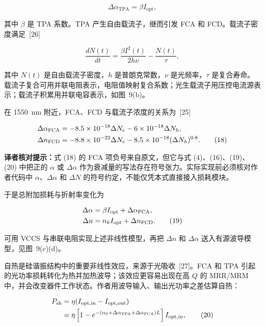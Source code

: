 \documentclass[11pt,a4paper]{ctexart}
\newcommand{\transnote}[1]{%
  \par\noindent\colorbox{yellow!16}{%
    \parbox{\dimexpr\linewidth-2\fboxsep}{\textbf{译者核对提示：}#1}}\par}
\begin{document}
\begin{equation}
\Delta\alpha_{\mathrm{TPA}}=\beta I_{\mathrm{opt}},
\tag{16}
\end{equation}

其中 $\beta$ 是 TPA 系数。TPA 产生自由载流子，继而引发 FCA 和 FCD。载流子密度满足~[26]

\begin{equation}
\frac{dN(t)}{dt}=\frac{\beta I^2(t)}{2h\nu}-\frac{N(t)}{\tau},
\tag{17}
\end{equation}

其中 $N(t)$ 是自由载流子密度，$h$ 是普朗克常数，$\nu$ 是光频率，$\tau$ 是复合寿命。载流子复合可用并联电阻表示，电阻值映射复合系数；光生载流子用压控电流源表示；载流子积累用并联电容表示，如图~9(b)。

在 1550~nm 附近，FCA、FCD 与载流子浓度的关系为~[25]

\begin{align}
\Delta\alpha_{\mathrm{FCA}}&=-8.5\times10^{-18}\Delta N_e
-6\times10^{-18}\Delta N_h,\notag\\
\Delta n_{\mathrm{FCD}}&=-8.8\times10^{-22}\Delta N_e
-8.5\times10^{-18}(\Delta N_h)^{0.8}.
\tag{18}
\end{align}

\transnote{式 (18) 的 FCA 项负号来自原文，但它与式 (4)、(16)、(19)、(20) 中把正的 $\alpha$ 或 $\Delta\alpha$ 作为衰减量的写法存在符号张力。实际实现前必须核对作者代码中 $\alpha$、$\Delta\alpha$ 和 $\Delta N$ 的符号约定，不能仅凭本式直接接入损耗模块。}

于是总附加损耗与折射率变化为

\begin{align}
\Delta\alpha&=\beta I_{\mathrm{opt}}+\Delta\alpha_{\mathrm{FCA}},\notag\\
\Delta n&=n_kI_{\mathrm{opt}}+\Delta n_{\mathrm{FCD}}.
\tag{19}
\end{align}

可用 VCCS 与串联电阻实现上述非线性模型，再把 $\Delta n$ 和 $\Delta\alpha$ 送入有源波导模型，见图~9(c)(d)。

自热是硅谐振结构中的重要非线性效应，来源于光吸收~[27]。FCA 和 TPA 引起的光功率损耗转化为热并加热波导；该效应更容易出现在高 $Q$ 的 MRR/MRM 中，并会改变器件工作状态。作者用波导输入、输出光功率之差估算自热：

\begin{align}
P_{\mathrm{sh}}&=\eta(I_{\mathrm{opt,in}}-I_{\mathrm{opt,out}})\notag\\
&=\eta\left[1-e^{-(\alpha_0+\Delta\alpha_{\mathrm{TPA}}+\Delta\alpha_{\mathrm{FCA}})L}\right]I_{\mathrm{opt,in}},
\tag{20}
\end{align}
\end{document}
